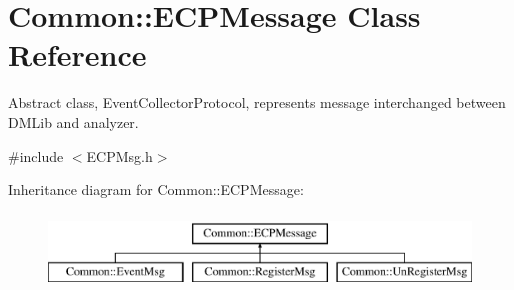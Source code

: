 \hypertarget{class_common_1_1_e_c_p_message}{\section{Common\-:\-:E\-C\-P\-Message Class Reference}
\label{class_common_1_1_e_c_p_message}
}


Abstract class, Event\-Collector\-Protocol, represents message interchanged between D\-M\-Lib and analyzer.  




{\ttfamily \#include $<$E\-C\-P\-Msg.\-h$>$}

Inheritance diagram for Common\-:\-:E\-C\-P\-Message\-:\begin{figure}[H]
\begin{center}
\leavevmode
\includegraphics[height=2.000000cm]{class_common_1_1_e_c_p_message}
\end{center}
\end{figure}
